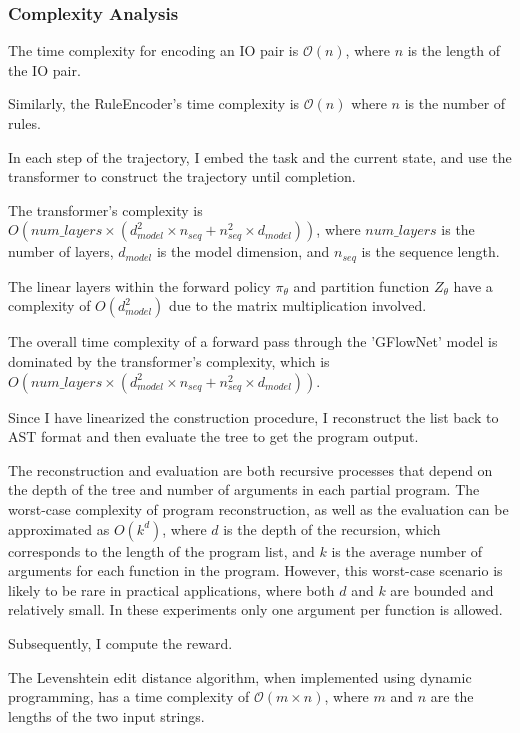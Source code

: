 \subsubsection{Complexity Analysis}

The time complexity for encoding an IO pair is \(\mathcal{O}(n)\), where \(n\) is the length of the IO pair. 

Similarly, the RuleEncoder's time complexity is \(\mathcal{O}(n)\) where \(n\) is the number of rules.

In each step of the trajectory, I embed the task and the current state, and use the transformer to construct the trajectory until completion. 

The transformer's complexity is \(O(num\_layers \times (d_{model}^2 \times n_{seq} + n_{seq}^2 \times d_{model}))\), where \(num\_layers\) is the number of layers, \(d_{model}\) is the model dimension, and \(n_{seq}\) is the sequence length.

The linear layers within the forward policy $\pi_\theta$ and partition function $Z_\theta$ have a complexity of \(O(d_{model}^2)\) due to the matrix multiplication involved.

The overall time complexity of a forward pass through the 'GFlowNet' model is dominated by the transformer's complexity, which is \(O(num\_layers \times (d_{model}^2 \times n_{seq} + n_{seq}^2 \times d_{model}))\).


Since I have linearized the construction procedure, I reconstruct the list back to AST format and then evaluate the tree to get the program output.

The reconstruction and evaluation are both recursive processes that depend on the depth of the tree and number of arguments in each partial program. 
The worst-case complexity of program reconstruction, as well as the evaluation can be approximated as \(O(k^d)\), where \(d\) is the depth of the recursion, which corresponds to the length of the program list, and \(k\) is the average number of arguments for each function in the program. However, this worst-case scenario is likely to be rare in practical applications, where both \(d\) and \(k\) are bounded and relatively small. In these experiments only one argument per function is allowed.

Subsequently, I compute the reward.

The Levenshtein edit distance algorithm, when implemented using dynamic programming, has a time complexity of 
$\mathcal{O}(m \times n)$, where $m$ and  $n$ are the lengths of the two input strings.



